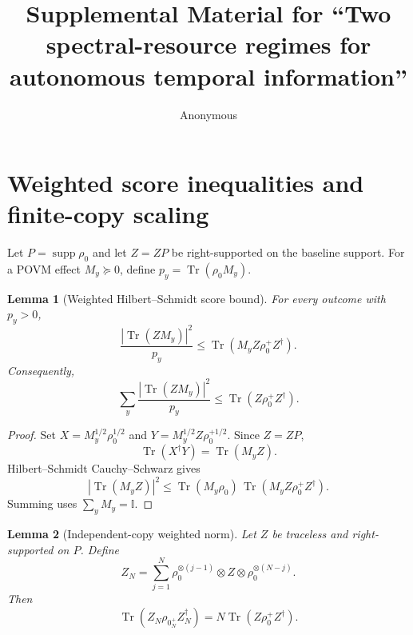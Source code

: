 \documentclass[aps,pra,preprint,nofootinbib]{revtex4-2}
\newtheorem{lemma}{Lemma}
\newcommand{\Tr}{\operatorname{Tr}}
\newcommand{\supp}{\operatorname{supp}}
\newcommand{\id}{\mathbb I}
\newcommand{\rhozero}{\rho_0}
\begin{document}
\title{Supplemental Material for ``Two spectral-resource regimes for autonomous temporal information''}
\author{Anonymous}
\maketitle

\section{Weighted score inequalities and finite-copy scaling}
\label{supp:score}

Let $P=\supp\rhozero$ and let $Z=ZP$ be right-supported on the baseline support. For a POVM effect $M_y\succeq0$, define $p_y=\Tr(\rhozero M_y)$.

\begin{lemma}[Weighted Hilbert--Schmidt score bound]
\label{lem:weighted-score}
For every outcome with $p_y>0$,
\begin{equation}
\frac{|\Tr(ZM_y)|^2}{p_y}
\le
\Tr(M_y Z\rhozero^+ Z^\dagger).
\label{eq:weighted-score}
\end{equation}
Consequently,
\begin{equation}
\sum_y\frac{|\Tr(ZM_y)|^2}{p_y}
\le
\Tr(Z\rhozero^+Z^\dagger).
\end{equation}
\end{lemma}

\begin{proof}
Set $X=M_y^{1/2}\rhozero^{1/2}$ and $Y=M_y^{1/2}Z\rhozero^{+1/2}$. Since $Z=ZP$,
\begin{equation}
\Tr(X^\dagger Y)=\Tr(M_yZ).
\end{equation}
Hilbert--Schmidt Cauchy--Schwarz gives
\begin{equation}
|\Tr(M_yZ)|^2
\le
\Tr(M_y\rhozero)\,
\Tr(M_yZ\rhozero^+Z^\dagger).
\end{equation}
Summing uses $\sum_yM_y=\id$.
\end{proof}

\begin{lemma}[Independent-copy weighted norm]
\label{lem:copy-scaling}
Let $Z$ be traceless and right-supported on $P$. Define
\begin{equation}
Z_N=\sum_{j=1}^N
\rhozero^{\otimes(j-1)}\otimes Z\otimes
\rhozero^{\otimes(N-j)}.
\end{equation}
Then
\begin{equation}
\Tr(Z_N\rhozero_N^+Z_N^\dagger)
=N\Tr(Z\rhozero^+Z^\dagger).
\label{eq:copy-scaling}
\end{equation}
\end{lemma}
\end{document}
